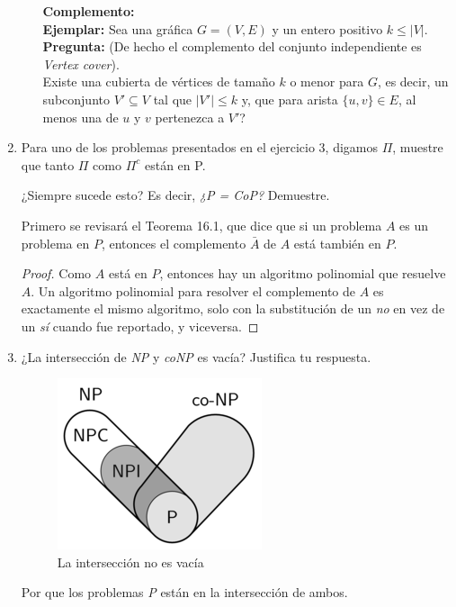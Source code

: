 \documentclass[11pt,letterpaper]{report}
\begin{document}
\begin{enumerate}
\begin{itemize}
    
    \medskip
    \textbf{Complemento:}\\
    \textbf{Ejemplar:} Sea una gráfica $G=(V,E)$ y un entero positivo $k \leq |V|$.\\
    \textbf{Pregunta:} (De hecho el complemento del conjunto independiente es \emph{Vertex cover}).\\
    Existe una cubierta de vértices de tamaño $k$ o menor para $G$, es decir, un subconjunto $V' \subseteq V$ tal que
    $|V'| \leq k$ y, que para arista $\{u,v\} \in E$, al menos una de $u$ y $v$ pertenezca a $V'$?

\end{itemize}


\item Para uno de los problemas presentados en el ejercicio 3, digamos $\Pi$, muestre que tanto 
$\Pi$ como $\Pi^c$ están en P.

¿Siempre sucede esto? Es decir, \textit{¿P = CoP?} Demuestre.

Primero se revisará el Teorema 16.1\cite{papa:COA:31027}, que dice que si un problema $A$ es un problema en $P$, entonces
el complemento $\bar{A}$ de $A$ está también en $P$.
\begin{proof}
    Como $A$ está en $P$, entonces hay un algoritmo polinomial que resuelve $A$. Un algoritmo
    polinomial para resolver el complemento de $A$ es exactamente el mismo algoritmo, solo con la
    substitución de un \emph{no} en vez de un \emph{sí} cuando fue reportado, y viceversa.
\end{proof}


\item ¿La intersección de \textit{NP} y \textit{coNP} es vacía? Justifica tu respuesta.

\begin{figure}[H]
    \centering
    \includegraphics[scale=0.75]{1.png}
    \caption{La intersección no es vacía}
\end{figure}

Por que los problemas \textit{P} están en la intersección de ambos.



\end{enumerate}
\end{document}
